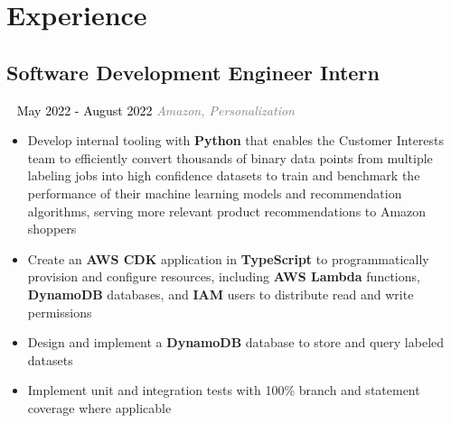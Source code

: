 \documentclass{article}
\newcommand{\resumesection}[3]{
    \subsection*{#1}
    \ 
    \normalsize
    \normalsize
    \hfill
    \textcolor{black}{#3}
    \normalsize
    \newline
    \small
    \textcolor{grey}{\emph{#2}}
}
\begin{document}
\section*{Experience}
\resumesection{Software Development Engineer Intern}{Amazon, Personalization}{May 2022 - August 2022}
\begin{itemize}
    \item Develop internal tooling with \textbf{Python} that enables the Customer Interests team to efficiently convert thousands of binary data points from multiple labeling jobs into high confidence datasets to train and benchmark the performance of their machine learning models and recommendation algorithms, serving more relevant product recommendations to Amazon shoppers
    \item Create an \textbf{AWS CDK} application in \textbf{TypeScript} to programmatically provision and configure resources, including \textbf{AWS Lambda} functions, \textbf{DynamoDB} databases, and \textbf{IAM} users to distribute read and write permissions
    \item Design and implement a \textbf{DynamoDB} database to store and query labeled datasets
    \item Implement unit and integration tests with 100\% branch and statement coverage where applicable
\end{itemize}
\end{document}
